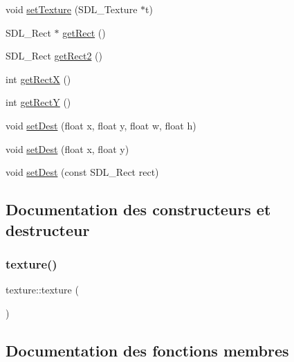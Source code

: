 \begin{DoxyCompactItemize}
\item 
void \hyperlink{classtexture_abf7ea8279da73bd2ed8c0542dca530e7}{set\+Texture} (S\+D\+L\+\_\+\+Texture $\ast$t)
\item 
S\+D\+L\+\_\+\+Rect $\ast$ \hyperlink{classtexture_ad4d301a9c4256c47d573be6883149017}{get\+Rect} ()
\item 
S\+D\+L\+\_\+\+Rect \hyperlink{classtexture_a8ed99332b143351af89b37e2515e151c}{get\+Rect2} ()
\item 
int \hyperlink{classtexture_a847597e55d2ca794717fcf9535ff3716}{get\+RectX} ()
\item 
int \hyperlink{classtexture_a281785ea874f7636de4a19bea9d53cbb}{get\+RectY} ()
\item 
void \hyperlink{classtexture_a54c6238b24c50e9da0c51c068b3381b2}{set\+Dest} (float x, float y, float w, float h)
\item 
void \hyperlink{classtexture_a7df432f0c64c23ed275355ccbf2e4a85}{set\+Dest} (float x, float y)
\item 
void \hyperlink{classtexture_a246c5085fbfac83bd30f30310fadbcf0}{set\+Dest} (const S\+D\+L\+\_\+\+Rect rect)
\end{DoxyCompactItemize}


\subsection{Documentation des constructeurs et destructeur}
\mbox{\label{classtexture_a67c03ae3cb8184199ab3127ce0f610c0}} 
\subsubsection{\texorpdfstring{texture()}{texture()}}
{\footnotesize\ttfamily texture\+::texture (\begin{DoxyParamCaption}{ }\end{DoxyParamCaption})}



\subsection{Documentation des fonctions membres}
\mbox{\label{classtexture_a62334e3f7ba2b06e2dfb6a3164d0c78f}} 
